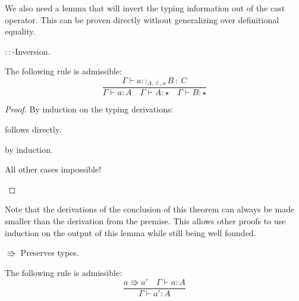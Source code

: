 We also need a lemma that will invert the typing information out of the cast operator.
This can be proven directly without generalizing over definitional equality.

\begin{lem} $::$-Inversion.
 
The following rule is admissible:
\[
\frac{\Gamma \vdash a::_{A,\ell ,o}B\::\:C}{\Gamma \vdash a:A\quad \Gamma \vdash A:\star\quad \Gamma \vdash B:\star}
\]
\end{lem}
 
\begin{proof}
By induction on the typing derivations:
\begin{casenv}
 \item {} follows directly.
 \item {} by induction.
 \item All other cases impossible!
\end{casenv}
\end{proof}
 
Note that the derivations of the conclusion of this theorem can always be made smaller than the derivation from the premise.
This allows other proofs to use induction on the output of this lemma while still being well founded.
 
\begin{thm} $\Rrightarrow$ Preserves types.
 
The following rule is admissible:
\[
\frac{a\Rrightarrow a'\quad \Gamma \vdash a:A}{\Gamma \vdash a':A}
\]
\end{thm}
 

